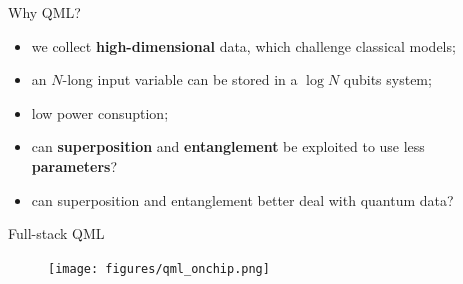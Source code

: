 \documentclass[8pt, xcolor={svgnames}, hyperref={linkcolor=black}]{beamer}
\begin{document}
\begin{frame}{Why QML?}
\begin{multicols}{2}
\begin{itemize}
\item<2,3,4,5,6,7>[\faCartPlus] we collect \textbf{high-dimensional} data, which challenge classical models;
\item<3,4,5,6,7>[\faCodepen] an $N$-long input variable can be stored in a $\log{N}$ qubits system; 
\item<4,5,6,7>[\faLeaf ] low power consuption;
\item<5,6,7>[\faCut] can \textbf{superposition} and \textbf{entanglement} be exploited to use less 
\textbf{parameters}?
\item<6,7>[\faUserSecret ] can superposition and entanglement better deal with quantum data?
\end{itemize}
\begin{figure}  
\end{figure}
\end{multicols}
\end{frame}

\begin{frame}{Full-stack QML}
\begin{figure}  
    \texttt{[image: figures/qml\_onchip.png]}
\end{figure}
\end{frame} 
\end{document}
